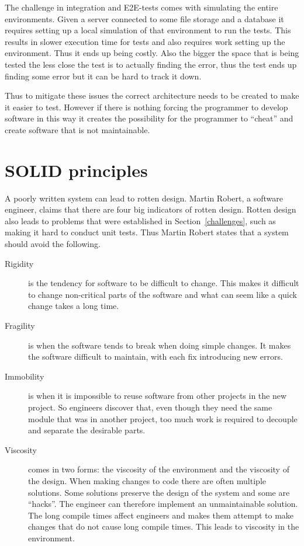 The challenge in integration and E2E-tests comes with simulating the entire
environments. Given a server connected to some file storage and a database it
requires setting up a local simulation of that environment to run the tests.
This results in slower execution time for tests and also requires work setting
up the environment. Thus it ends up being costly. Also the bigger the space
that is being tested the less close the test is to actually finding the error,
thus the test ends up finding some error but it can be hard to track it down.

Thus to mitigate these issues the correct architecture needs to be created to
make it easier to test. However if there is nothing forcing the programmer to
develop software in this way it creates the possibility for the programmer to
``cheat'' and create software that is not maintainable. 

\section{SOLID principles}\label{oop}

A poorly written system can lead to rotten design. Martin Robert, a software
engineer, claims that there are four big indicators of rotten design. Rotten
design also leads to problems that were established in
Section~\ref{challenges}, such as making it hard to conduct unit tests. Thus
Martin Robert states that a system should avoid the following.

\begin{description}

\item[ Rigidity ] is the tendency for software to be difficult to
change. This makes it difficult to change non-critical parts of the software and
what can seem like a quick change takes a long time.

\item[ Fragility ] is when the software tends to break when doing
simple changes. It makes the software difficult to maintain, with each fix
introducing new errors.

\item[ Immobility ] is when it is impossible to reuse software from
other projects in the new project. So engineers discover that, even though they
need the same module that was in another project, too much work is required to
decouple and separate the desirable parts.

\item[ Viscosity ] comes in two forms: the viscosity of the environment and the
viscosity of the design. When making changes to code there are often multiple
solutions. Some solutions preserve the design of the system and some are
``hacks''. The engineer can therefore implement an unmaintainable solution. The
long compile times affect engineers and makes them attempt to make changes that
do not cause long compile times.  This leads to viscosity in the environment.

\end{description}

